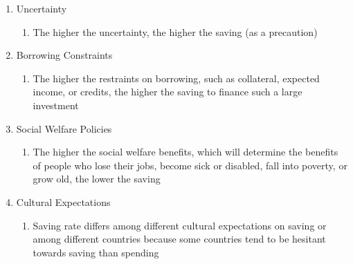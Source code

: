 \documentclass[12pt]{article}
\begin{document}
\begin{enumerate}
\begin{enumerate}
\begin{enumerate}
\begin{enumerate}
                \end{enumerate}

              \item Uncertainty

                \begin{enumerate}

                  \item The higher the uncertainty, the higher the saving (as a precaution)

                \end{enumerate}

              \item Borrowing Constraints

                \begin{enumerate}

                  \item The higher the restraints on borrowing, such as collateral, expected income, or credits, the higher the saving to finance such a large investment

                \end{enumerate}

              \item Social Welfare Policies

                \begin{enumerate}

                  \item The higher the social welfare benefits, which will determine the benefits of people who lose their jobs, become sick or disabled, fall into poverty, or grow old, the lower the saving

                \end{enumerate}

              \item Cultural Expectations

                \begin{enumerate}

                  \item Saving rate differs among different cultural expectations on saving or among different countries because some countries tend to be hesitant towards saving than spending

                \end{enumerate}

            \end{enumerate}


\end{enumerate}
\end{enumerate}
\end{document}
